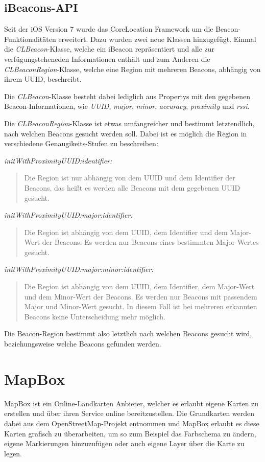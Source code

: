 \subsection{iBeacons-API}
\label{sec:technologies:corelocation:ibeaconsapi}
Seit der iOS Version 7 wurde das CoreLocation Framework um die Beacon-Funktionalitäten erweitert. 
Dazu wurden zwei neue Klassen hinzugefügt. Einmal die \emph{CLBeacon}-Klasse, welche ein iBeacon repräsentiert und alle zur verfügungsteheneden Informationen enthält und zum Anderen die \emph{CLBeaconRegion}-Klasse, welche eine Region mit mehreren Beacons, abhängig von ihrem UUID, beschreibt.

Die \emph{CLBeacon}-Klasse besteht dabei lediglich aus Propertys mit den gegebenen Beacon-Informationen, wie \emph{UUID}, \emph{major}, \emph{minor}, \emph{accuracy}, \emph{proximity} und \emph{rssi}.

Die \emph{CLBeaconRegion}-Klasse ist etwas umfangreicher und bestimmt letztendlich, nach welchen Beacons gesucht werden soll.
Dabei ist es möglich die Region in verschiedene Genaugikeits-Stufen zu beschreiben:


\emph{initWithProximityUUID:identifier:}\begin{quote}
	Die Region ist nur abhängig von dem UUID und dem Identifier der Beacons, das heißt es werden alle Beacons mit dem gegebenen UUID gesucht.
\end{quote}
\emph{initWithProximityUUID:major:identifier:}\begin{quote}
	Die Region ist abhängig von dem UUID, dem Identifier und dem Major-Wert der Beacons. Es werden nur Beacons eines bestimmten Major-Wertes gesucht.
\end{quote}
\emph{initWithProximityUUID:major:minor:identifier:}\begin{quote}
	Die Region ist abhängig von dem UUID, dem Identifier, dem Major-Wert und dem Minor-Wert der Beacons. Es werden nur Beacons mit passendem Major und Minor-Wert gesucht. In diesem Fall ist bei mehreren erkannten Beacons keine Unterscheidung mehr möglich.
\end{quote}

Die Beacon-Region bestimmt also letztlich nach welchen Beacons gesucht wird, beziehungsweise welche Beacons gefunden werden.

\section{MapBox}
\label{sec:sec:technologies:mapbox}
MapBox ist ein Online-Landkarten Anbieter, welcher es erlaubt eigene Karten zu erstellen und über ihren Service online bereitzustellen. 
Die Grundkarten werden dabei aus dem OpenStreetMap-Projekt entnommen und MapBox erlaubt es diese Karten grafisch zu überarbeiten, um so zum Beispiel das Farbschema zu ändern, eigene Markierungen hinzuzufügen oder auch eigene Layer über die Karte zu legen.

